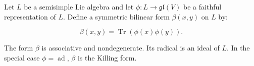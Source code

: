 Let $L$ be a semisimple Lie algebra and let $\phi: L \rightarrow \mathfrak{gl}(V)$ be a faithful representation of $L$. Define a symmetric bilinear form $\beta(x, y)$ on $L$ by:

$$\beta(x, y) = \operatorname{Tr}(\phi(x)\phi(y)).$$

The form $\beta$ is associative and nondegenerate. Its radical is an ideal of $L$. In the special case $\phi = \operatorname{ad}$, $\beta$ is the Killing form.
